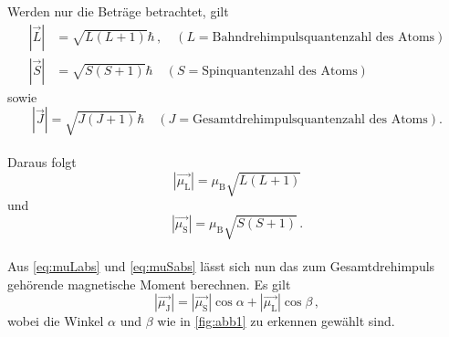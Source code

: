 Werden nur die Beträge betrachtet, gilt
\begin{align}
    |\vec{L}| &= \sqrt{L(L + 1)} \hbar \,, \quad (L = \text{Bahndrehimpulsquantenzahl des Atoms}) 
    \label{eq:Labs} \\
    |\vec{S}| &= \sqrt{S(S + 1)} \hbar \quad (S = \text{Spinquantenzahl des Atoms})
    \label{eq:Sabs}
\end{align}
sowie
\begin{equation}
    |\vec{J}| = \sqrt{J(J + 1)} \hbar \quad (J = \text{Gesamtdrehimpulsquantenzahl des Atoms}).
    \label{eq:Jabs}
\end{equation} \\

Daraus folgt
\begin{equation}
    |\vec{\mu_\text{L}}| = \mu_\text{B} \sqrt{L(L + 1)}
    \label{eq:muLabs}
\end{equation}
und
\begin{equation}
    |\vec{\mu_\text{S}}| = \mu_\text{B} \sqrt{S(S + 1)} \,.
    \label{eq:muSabs}
\end{equation} \\

Aus \eqref{eq:muLabs} und \eqref{eq:muSabs} lässt sich nun das zum Gesamtdrehimpuls gehörende magnetische Moment
berechnen.
Es gilt
\begin{equation}
    |\vec{\mu_\text{J}}| = |\vec{\mu_\text{S}}| \cos \alpha + |\vec{\mu_\text{L}}| \cos\beta \,,
\end{equation}
wobei die Winkel $\alpha$ und $\beta$ wie in \autoref{fig:abb1} zu erkennen gewählt sind.

